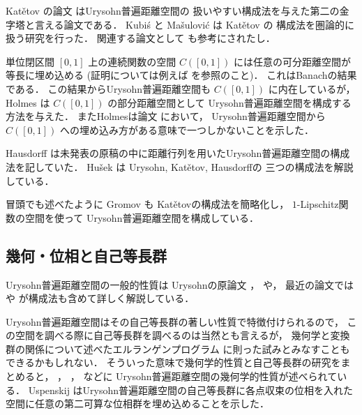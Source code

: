 \documentclass[leqno, 12pt]{jsarticle}
\begin{document}
Kat\v{e}tov
の論文
\cite{Ka}
はUrysohn普遍距離空間の
扱いやすい構成法を与えた第二の金字塔と言える論文である．
Kubi\'{s}
と
Ma\v{s}ulovi\'{c}
\cite{KM}
は
Kat\v{e}tov
の
構成法を圏論的に扱う研究を行った．
関連する論文として
\cite{Gre}
も参考にされたし．



単位閉区間
$[0, 1]$
上の連続関数の空間
$C([0, 1])$
には任意の可分距離空間が等長に埋め込める
(証明については例えば
\cite{Hei}を参照のこと)．
これはBanachの結果である．
この結果からUrysohn普遍距離空間も
$C([0, 1])$
に内在しているが，
Holmes
\cite{Holmes}
は
$C([0, 1])$
の部分距離空間として
Urysohn普遍距離空間を構成する方法を与えた．
またHolmesは論文
\cite{Holmes2}
において，
Urysohn普遍距離空間から
$C([0, 1])$
への埋め込み方がある意味で一つしかないことを示した．



Hausdorff
 \cite{Ha}
 は未発表の原稿の中に距離行列を用いたUrysohn普遍距離空間の構成法を記していた．
Hu\v{s}ek
 \cite{Hu}
 は
 Urysohn, Kat\v{e}tov,
  Hausdorffの
  三つの構成法を解説している．




冒頭でも述べたように
Gromov
\cite{Greenbook}
も
Kat\v{e}tovの構成法を簡略化し，
$1$-Lipschitz関数の空間を使って
Urysohn普遍距離空間を構成している．




\subsection{幾何・位相と自己等長群}\label{subsec:research:geometry-topology}

Urysohn普遍距離空間の一般的性質は
Urysohnの原論文
\cite{Ury1}，
\cite{Ury2}や，
最近の論文では
\cite{Mell2007}
や
\cite{Mell2008}
が構成法も含めて詳しく解説している．



Urysohn普遍距離空間はその自己等長群の著しい性質で特徴付けられるので，
この空間を調べる際に自己等長群を調べるのは当然とも言えるが，
幾何学と変換群の関係について述べたエルランゲンプログラム
に則った試みとみなすこともできるかもしれない．
そういった意味で幾何学的性質と自己等長群の研究をまとめると，
\cite{Mell2007}，
\cite{Mell2008}，
 \cite{GK}などに
Urysohn普遍距離空間の幾何学的性質が述べられている．
Uspenskij
\cite{Usp}
はUrysohn普遍距離空間の自己等長群に各点収束の位相を入れた空間に任意の第二可算な位相群を埋め込めることを示した．
\end{document}
